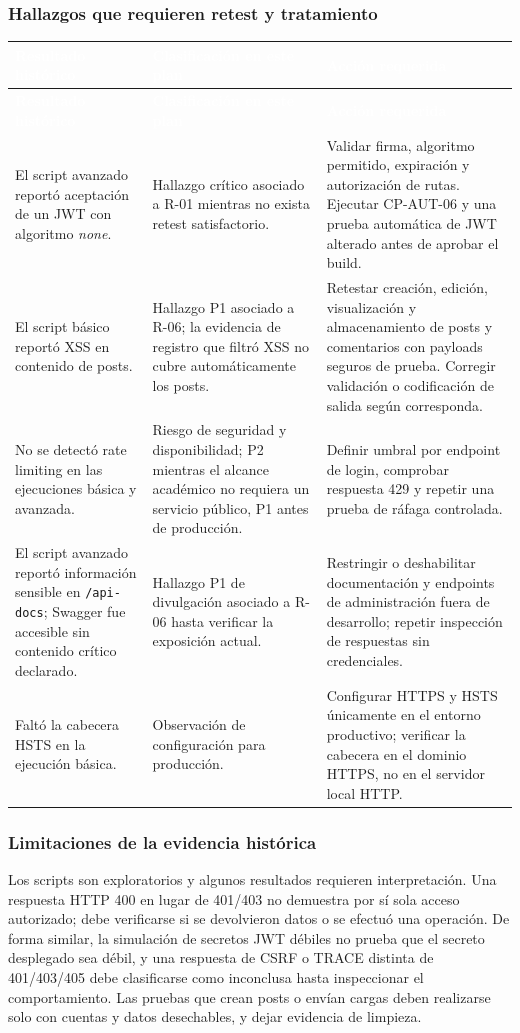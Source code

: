 \documentclass[11pt,a4paper]{article}
\newcommand{\thead}[1]{\textcolor{white}{\textbf{#1}}}
\begin{document}
\subsubsection{Hallazgos que requieren retest y tratamiento}
\begin{longtable}{p{5.0cm}p{5.0cm}p{4.55cm}}
\rowcolor{uniwayblue}\thead{Resultado histórico} & \thead{Clasificación en este plan} & \thead{Acción requerida}\\
\endfirsthead
\rowcolor{uniwayblue}\thead{Resultado histórico} & \thead{Clasificación en este plan} & \thead{Acción requerida}\\
\endhead
El script avanzado reportó aceptación de un JWT con algoritmo \emph{none}. & Hallazgo crítico asociado a R-01 mientras no exista retest satisfactorio. & Validar firma, algoritmo permitido, expiración y autorización de rutas. Ejecutar CP-AUT-06 y una prueba automática de JWT alterado antes de aprobar el build.\\
\rowcolor{lightgray}El script básico reportó XSS en contenido de posts. & Hallazgo P1 asociado a R-06; la evidencia de registro que filtró XSS no cubre automáticamente los posts. & Retestar creación, edición, visualización y almacenamiento de posts y comentarios con payloads seguros de prueba. Corregir validación o codificación de salida según corresponda.\\
No se detectó rate limiting en las ejecuciones básica y avanzada. & Riesgo de seguridad y disponibilidad; P2 mientras el alcance académico no requiera un servicio público, P1 antes de producción. & Definir umbral por endpoint de login, comprobar respuesta 429 y repetir una prueba de ráfaga controlada.\\
\rowcolor{lightgray}El script avanzado reportó información sensible en \texttt{/api-docs}; Swagger fue accesible sin contenido crítico declarado. & Hallazgo P1 de divulgación asociado a R-06 hasta verificar la exposición actual. & Restringir o deshabilitar documentación y endpoints de administración fuera de desarrollo; repetir inspección de respuestas sin credenciales.\\
Faltó la cabecera HSTS en la ejecución básica. & Observación de configuración para producción. & Configurar HTTPS y HSTS únicamente en el entorno productivo; verificar la cabecera en el dominio HTTPS, no en el servidor local HTTP.\\
\end{longtable}

\subsubsection{Limitaciones de la evidencia histórica}
Los scripts son exploratorios y algunos resultados requieren interpretación. Una respuesta HTTP 400 en lugar de 401/403 no demuestra por sí sola acceso autorizado; debe verificarse si se devolvieron datos o se efectuó una operación. De forma similar, la simulación de secretos JWT débiles no prueba que el secreto desplegado sea débil, y una respuesta de CSRF o TRACE distinta de 401/403/405 debe clasificarse como inconclusa hasta inspeccionar el comportamiento. Las pruebas que crean posts o envían cargas deben realizarse solo con cuentas y datos desechables, y dejar evidencia de limpieza.
\end{document}
